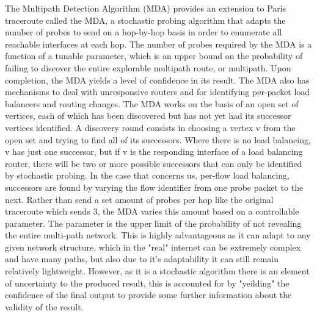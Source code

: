 The Multipath Detection Algorithm (MDA) provides an extension to Paris traceroute called the MDA, a stochastic probing algorithm that adapts the number of
probes to send on a hop-by-hop basis in order to enumerate all reachable interfaces at each hop. The number of probes required by the MDA is a function of a tunable parameter, which is an upper bound on the probability of failing to discover the entire explorable multipath route, or multipath. Upon completion, the MDA yields a level of confidence in its result. The MDA also has mechanisms to deal with unresponsive routers and for identifying per-packet load balancers and routing changes.\cite{MDA2} The MDA works on the basis of an open set of vertices, each of which has been discovered but has not yet had its successor vertices identified. A discovery round consists in choosing a vertex v from the open set and trying to find all of its successors. Where there is no load balancing, v has just one successor, but if v is the responding interface of a load balancing router, there will be two or more possible successors that can only be identified by stochastic probing. In the case that concerns us, per-flow load balancing, successors are found by varying the flow identifier from one probe packet to the next. \cite{MDA-lite}\cite{diamond-miner}\cite{MDA3}
Rather than send a set amount of probes per hop like the original traceroute which sends 3, the MDA varies this amount based on a controllable parameter. The parameter is the upper limit of the probability of not revealing the entire multi-path network. This is highly advantageous as it can adapt to any given network structure, which in the "real" internet can be extremely complex and have many paths, but also due to it's adaptability it can still remain relatively lightweight. However, as it is a stochastic algorithm there is an element of uncertainty to the produced result, this is accounted for by "yeilding" the  confidence of the final output to provide some further information about the validity of the result.

